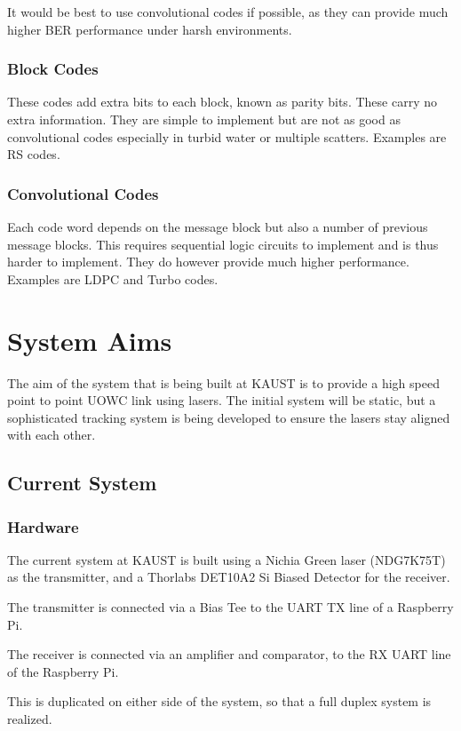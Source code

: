 \documentclass{article}
\begin{document}
It would be best to use convolutional codes if possible, as they can provide
much higher \ac{BER} performance under harsh environments.

\subsubsection{Block Codes}
These codes add extra bits to each block, known as parity bits. These carry
no extra information. They are simple to implement but are not as good as
convolutional codes especially in turbid water or multiple scatters. Examples
are \ac{RS} codes.

\subsubsection{Convolutional Codes}
Each code word depends on the message block but also a number of previous
message blocks. This requires sequential logic circuits to implement and is
thus harder to implement. They do however provide much higher performance.
Examples are \ac{LDPC} and Turbo codes.

\section{System Aims}
The aim of the system that is being built at \ac{KAUST} is to provide a high
speed point to point \ac{UOWC} link using lasers. The initial system will be
static, but a sophisticated tracking system is being developed to ensure the
lasers stay aligned with each other.

\subsection{Current System}

\subsubsection{Hardware}
The current system at \ac{KAUST} is built using a Nichia Green laser (NDG7K75T)
as the transmitter, and a Thorlabs DET10A2 Si Biased Detector for the receiver.

The transmitter is connected via a Bias Tee to the UART TX line of a
Raspberry Pi.

The receiver is connected via an amplifier and comparator, to the RX UART
line of the Raspberry Pi.

This is duplicated on either side of the system, so that a full duplex
system is realized.
\end{document}
